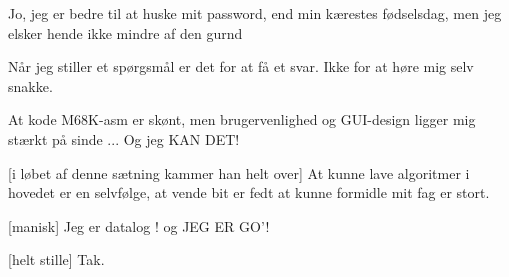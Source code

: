 \documentclass[a4paper,12pt]{article}
\begin{document}
\begin{sketch}
 Jo, jeg er bedre til at huske mit password, end min kærestes fødselsdag, men jeg 
elsker hende ikke mindre af den gurnd

 Når jeg stiller et spørgsmål er det for at få et svar.
Ikke for at høre mig selv snakke.

 At kode M68K-asm er skønt, men brugervenlighed og GUI-design ligger mig stærkt 
på sinde ... Og jeg KAN DET!

[i løbet af denne sætning kammer han helt over] At kunne lave algoritmer i hovedet er en selvfølge, at vende bit er fedt at 
kunne formidle mit fag er stort.

[manisk] Jeg er datalog !  og JEG ER GO'!


[helt stille] Tak.



\end{sketch}
\end{document}

